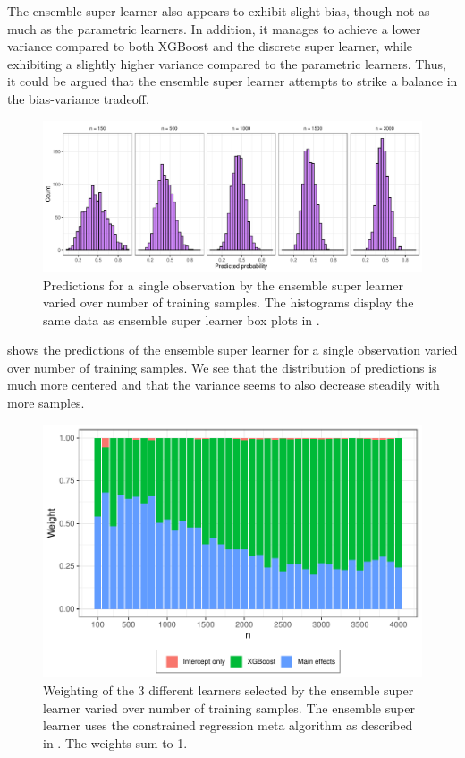 \documentclass[./main.tex]{subfiles}
\begin{document}
The ensemble super learner also appears to exhibit slight bias, though not as much as the parametric learners. In addition, it manages to achieve a lower variance compared to both XGBoost and the discrete super learner, while exhibiting a slightly higher variance compared to the parametric learners. Thus, it could be argued that the ensemble super learner attempts to strike a balance in the bias-variance tradeoff.
\begin{figure}[H]
    \centering
    \includegraphics[width=\textwidth]{figures/hist_esl_dist.pdf}
    \caption{Predictions for a single observation by the ensemble super learner varied over number of training samples. The histograms display the same data as ensemble super learner box plots in .}
    \label{fig:hist_esl_dist}
\end{figure}
 shows the predictions of the ensemble super learner for a single observation varied over number of training samples. We see that the distribution of predictions is much more centered and that the variance seems to also decrease steadily with more samples. 
\begin{figure}[H]
    \centering
    \includegraphics[width=\textwidth]{figures/esl_weights.pdf}
    \caption{Weighting of the 3 different learners selected by the ensemble super learner varied over number of training samples. The ensemble super learner uses the constrained regression meta algorithm as described in . The weights sum to 1.}
    \label{fig:esl_weights}
\end{figure}
\end{document}
